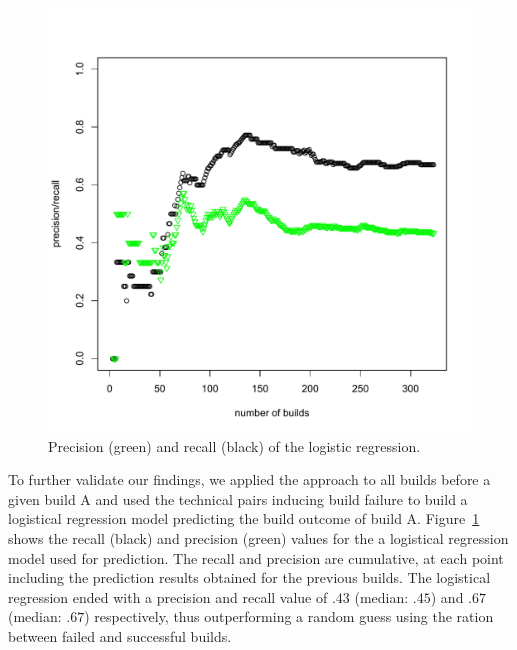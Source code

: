 \documentclass[conference]{IEEEtran}
\begin{document}
\begin{figure}[t]
\vspace{-29pt}
\centering
\includegraphics[width=\columnwidth]{precision-recall-logreg}
\vspace{-25pt}
\caption{Precision (green) and recall (black) of the logistic regression.}
\label{fig:prediction}
\end{figure}

To further validate our findings, we applied the approach to all builds before a given build A and used the technical pairs inducing build failure to build a logistical regression model predicting the build outcome of build A.
Figure~\ref{fig:prediction} shows the recall (black) and precision (green) values for the
a logistical regression model used for prediction.
The recall and precision are cumulative, at each point including the prediction results obtained for the previous builds.
The logistical regression ended with a precision and recall value of $.43$ (median: $.45$) and $.67$ (median: $.67$) respectively, thus outperforming a random guess using the ration between failed and successful builds.
\end{document}
